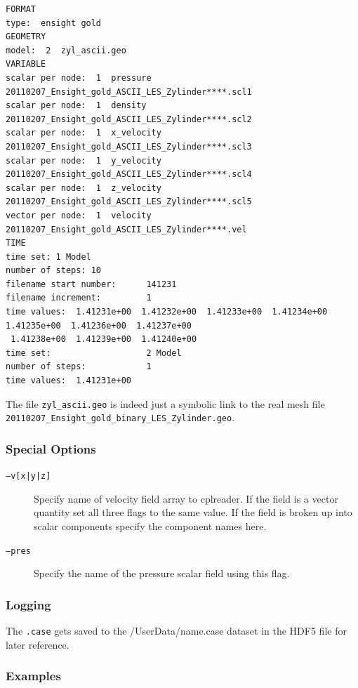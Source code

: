 \documentclass[a4paper,10pt]{article}
\begin{document}
\begin{verbatim}
FORMAT
type:  ensight gold
GEOMETRY
model:  2  zyl_ascii.geo
VARIABLE
scalar per node:  1  pressure                  20110207_Ensight_gold_ASCII_LES_Zylinder****.scl1
scalar per node:  1  density                   20110207_Ensight_gold_ASCII_LES_Zylinder****.scl2
scalar per node:  1  x_velocity                20110207_Ensight_gold_ASCII_LES_Zylinder****.scl3
scalar per node:  1  y_velocity                20110207_Ensight_gold_ASCII_LES_Zylinder****.scl4
scalar per node:  1  z_velocity                20110207_Ensight_gold_ASCII_LES_Zylinder****.scl5
vector per node:  1  velocity                  20110207_Ensight_gold_ASCII_LES_Zylinder****.vel
TIME
time set: 1 Model
number of steps: 10
filename start number:      141231
filename increment:         1
time values:  1.41231e+00  1.41232e+00  1.41233e+00  1.41234e+00  1.41235e+00  1.41236e+00  1.41237e+00 
 1.41238e+00  1.41239e+00  1.41240e+00 
time set:                   2 Model
number of steps:            1
time values:  1.41231e+00
\end{verbatim}

The file {\tt zyl\_ascii.geo} is indeed  just a symbolic link to the real mesh
file {\tt 20110207\_Ensight\_gold\_binary\_LES\_Zylinder.geo}.

\subsubsection{Special Options}

\begin{description}
  \item[{\tt   --v[x|y|z]}]  Specify   name   of  velocity   field  array   to
cplreader. If the field  is a vector quantity set all three  flags to the same
value. If the field is broken  up into scalar components specify the component
names here.

  \item[{\tt --pres}] Specify the name of the pressure scalar field using this
flag.
\end{description}


\subsubsection{Logging} 

The {\tt .case} gets saved to the /UserData/name.case dataset in the HDF5 file
for later reference.

\subsubsection{Examples}
\end{document}
